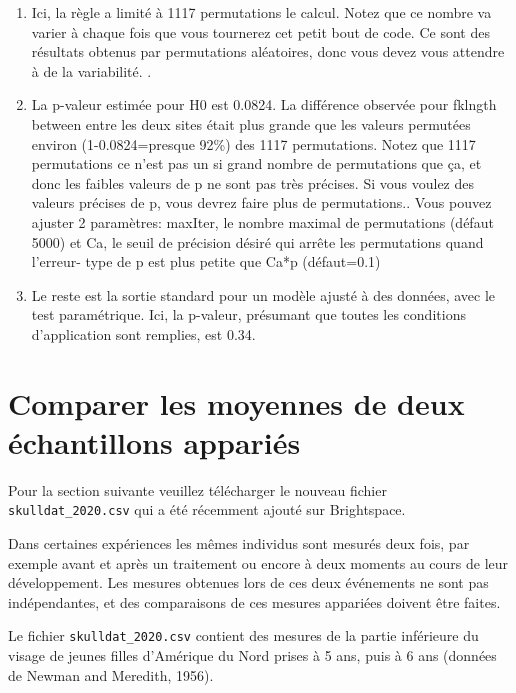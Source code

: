 \documentclass[12pt,]{book}
\makeatletter
\providecommand{\tightlist}{%
  \setlength{\itemsep}{0pt}\setlength{\parskip}{0pt}}
\newenvironment{kframe}{%
\medskip{}
\setlength{\fboxsep}{.8em}
\def\at@end@of@kframe{}%
\ifinner\ifhmode%
 \def\at@end@of@kframe{\end{minipage}}%
 \begin{minipage}{\columnwidth}%
\fi\fi%
\def\FrameCommand##1{\hskip\@totalleftmargin \hskip-\fboxsep
\colorbox{incolor}{##1}\hskip-\fboxsep
    \hskip-\linewidth \hskip-\@totalleftmargin \hskip\columnwidth}%
\MakeFramed {\advance\hsize-\width
  \@totalleftmargin\z@ \linewidth\hsize
  \@setminipage}}%
{\par\unskip\endMakeFramed%
\at@end@of@kframe}
\newenvironment{rmdblock}[1]
 {
 \begin{itemize}
 \renewcommand{\labelitemi}{
   \raisebox{-.7\height}[0pt][0pt]{
     {\setkeys{Gin}{width=3em,keepaspectratio}\texttt{[image: images/\#1]}}
   }
 }
 \begin{kframe}
 \setlength{\fboxsep}{1em}
 \item
 }
 {
 \end{kframe}
 \end{itemize}
 }
\newenvironment{rmdwarning}
  {\begin{rmdblock}{warning}}
  {\end{rmdblock}}
\makeatother
\begin{document}
\begin{enumerate}
\def\labelenumi{\arabic{enumi}.}
\tightlist
\item
  Ici, la règle a limité à 1117 permutations le calcul. Notez que ce nombre va varier à chaque fois que vous tournerez cet petit bout de code. Ce sont des résultats obtenus par permutations aléatoires, donc vous devez vous attendre à de la variabilité. .
\item
  La p-valeur estimée pour H0 est 0.0824. La différence observée pour fklngth between entre les deux sites était plus grande que les valeurs permutées environ (1-0.0824=presque 92\%) des 1117 permutations. Notez que 1117 permutations ce n'est pas un si grand nombre de permutations que ça, et donc les faibles valeurs de p ne sont pas très précises. Si vous voulez des valeurs précises de p, vous devrez faire plus de permutations.. Vous pouvez ajuster 2 paramètres: maxIter, le nombre maximal de permutations (défaut 5000) et Ca, le seuil de précision désiré qui arrête les permutations quand l'erreur- type de p est plus petite que Ca*p (défaut=0.1)
\item
  Le reste est la sortie standard pour un modèle ajusté à des
  données, avec le test paramétrique. Ici, la p-valeur, présumant que toutes les conditions d'application sont remplies, est 0.34.
\end{enumerate}

\hypertarget{comparer-les-moyennes-de-deux-uxe9chantillons-appariuxe9s}{%
\section{Comparer les moyennes de deux échantillons appariés}\label{comparer-les-moyennes-de-deux-uxe9chantillons-appariuxe9s}}

\begin{rmdwarning}
Pour la section suivante veuillez télécharger le nouveau fichier \texttt{skulldat\_2020.csv} qui a été récemment ajouté sur Brightspace.
\end{rmdwarning}

Dans certaines expériences les mêmes individus sont mesurés deux fois, par exemple avant et après un traitement ou encore à deux moments au cours de leur développement. Les mesures obtenues lors de ces deux événements ne sont pas indépendantes, et des comparaisons de ces mesures appariées doivent être faites.

Le fichier \texttt{skulldat\_2020.csv} contient des mesures de la partie inférieure du visage de jeunes filles d'Amérique du Nord prises à 5 ans, puis à 6 ans (données de Newman and Meredith, 1956).
\end{document}
